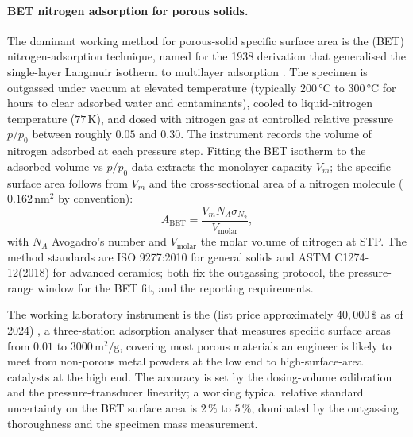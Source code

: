 \paragraph{BET nitrogen adsorption for porous solids.}
The dominant working method for porous-solid specific surface area
is the  (BET) nitrogen-adsorption
technique, named for the 1938 derivation that generalised the
single-layer Langmuir isotherm to multilayer adsorption
\cite{ch07t3b-paper:brunauer-emmett-teller-1938}. The specimen is
outgassed under vacuum at elevated temperature (typically
$200 \,\si{\degreeCelsius}$ to $300 \,\si{\degreeCelsius}$ for hours
to clear adsorbed water and contaminants), cooled to liquid-nitrogen
temperature ($77 \,\si{\kelvin}$), and dosed with nitrogen gas at
controlled relative pressure $p/p_{0}$ between roughly $0.05$ and
$0.30$. The instrument records the volume of nitrogen adsorbed at
each pressure step. Fitting the BET isotherm to the adsorbed-volume
vs $p/p_{0}$ data extracts the monolayer capacity $V_{m}$; the
specific surface area follows from $V_{m}$ and the cross-sectional
area of a nitrogen molecule ($0.162 \,\si{\nano\meter\squared}$ by
convention):
\[
A_{\mathrm{BET}} = \frac{V_{m} N_{A} \sigma_{N_{2}}}{V_{\mathrm{molar}}},
\]
with $N_{A}$ Avogadro's number and $V_{\mathrm{molar}}$ the molar
volume of nitrogen at STP. The method standards are ISO 9277:2010
\cite{ch07t3b-std:iso-9277-2010} for general solids and
ASTM C1274-12(2018) \cite{ch07t3b-std:astm-c1274-2018} for advanced
ceramics; both fix the outgassing protocol, the pressure-range
window for the BET fit, and the reporting requirements.

The working laboratory instrument is the
 (list price approximately
$40{,}000 \,\$ $ as of 2024)
\cite{ch07t3b-web:micromeritics-tristar-ii}, a three-station
adsorption analyser that measures specific surface areas from
$0.01$ to $3000 \,\si{\meter\squared\per\gram}$, covering most
porous materials an engineer is likely to meet from
non-porous metal powders at the low end to high-surface-area
catalysts at the high end. The accuracy is set by the dosing-volume
calibration and the pressure-transducer linearity; a working
typical relative standard uncertainty on the BET surface area is
$2\,\%$ to $5\,\%$, dominated by the outgassing thoroughness and
the specimen mass measurement.

